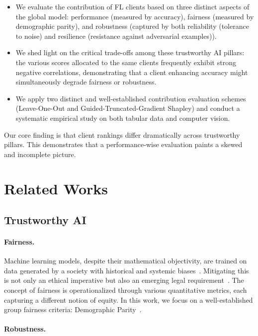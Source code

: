 \documentclass[sigconf]{acmart}
\begin{document}
\begin{itemize}
    \item We evaluate the contribution of FL clients based on three distinct aspects of the global model: performance (measured by accuracy), fairness (measured by demographic parity), and robustness (captured by both reliability (tolerance to noise) and resilience (resistance against adversarial examples)).
    \item We shed light on the critical trade-offs among these trustworthy AI pillars: the various scores allocated to the same clients frequently exhibit strong negative correlations, demonstrating that a client enhancing accuracy might simultaneously degrade fairness or robustness.
    \item We apply two distinct and well-established contribution evaluation schemes (Leave-One-Out and Guided-Truncated-Gradient Shapley) and conduct a systematic empirical study on both tabular data and computer vision.
\end{itemize}

Our core finding is that client rankings differ dramatically across trustworthy pillars. This demonstrates that a performance-wise evaluation paints a skewed and incomplete picture.

\section{Related Works}
\label{sec:RW}

\subsection{Trustworthy AI}

\paragraph{Fairness. }

Machine learning models, despite their mathematical objectivity, are trained on data generated by a society with historical and systemic biases~\cite{mehrabi2021survey}. Mitigating this is not only an ethical imperative but also an emerging legal requirement~\cite{wachter2020bias}. The concept of fairness is operationalized through various quantitative metrics, each capturing a different notion of equity. In this work, we focus on a well-established group fairness criteria: Demographic Parity~\cite{calders2009building}.

\paragraph{Robustness. }
\end{document}
